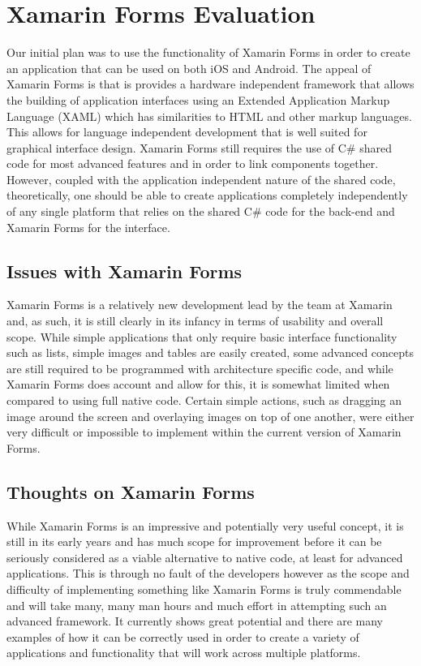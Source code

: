 \documentclass[12pt,a4paper]{report}
\begin{document}
\section{Xamarin Forms Evaluation}

Our initial plan was to use the functionality of Xamarin Forms in order to create an application that can be used on both iOS and Android. The appeal of Xamarin Forms is that is provides a hardware independent framework that allows the building of application interfaces using an Extended Application Markup Language (XAML) which has similarities to HTML and other markup languages. This allows for language independent development that is well suited for graphical interface design. Xamarin Forms still requires the use of C\# shared code for most advanced features and in order to link components together. However, coupled with the application independent nature of the shared code, theoretically, one should be able to create applications completely independently of any single platform that relies on the shared C\# code for the back-end and Xamarin Forms for the interface.

\subsection{Issues with Xamarin Forms}

Xamarin Forms is a relatively new development lead by the team at Xamarin and, as such, it is still clearly in its infancy in terms of usability and overall scope. While simple applications that only require basic interface functionality such as lists, simple images and tables are easily created, some advanced concepts are still required to be programmed with architecture specific code, and while Xamarin Forms does account and allow for this, it is somewhat limited when compared to using full native code. Certain simple actions, such as dragging an image around the screen and overlaying images on top of one another, were either very difficult or impossible to implement within the current version of Xamarin Forms.

\subsection{Thoughts on Xamarin Forms}
While Xamarin Forms is an impressive and potentially very useful concept, it is still in its early years and has much scope for improvement before it can be seriously considered as a viable alternative to native code, at least for advanced applications. This is through no fault of the developers however as the scope and difficulty of implementing something like Xamarin Forms is truly commendable and will take many, many man hours and much effort in attempting such an advanced framework. It currently shows great potential and there are many examples of how it can be correctly used in order to create a variety of applications and functionality that will work across multiple platforms.
\end{document}
